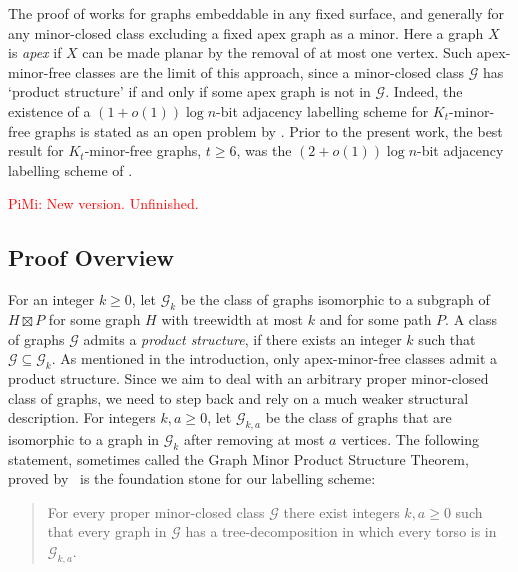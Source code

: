 \documentclass{patmorin}
\renewcommand{\geq}{\geqslant}
\newcommand{\piotr}[1]{\noindent\textcolor{red}{PiMi: #1}}
\newcommand{\defin}[1]{\emph{\textcolor{brightmaroon}{#1}}}
\newcommand{\calG}{\mathcal{G}}
\begin{document}
The proof of \citet{dujmovic.esperet.ea:adjacency} works for  graphs embeddable in any fixed surface, and generally for any minor-closed class excluding a fixed apex graph as a minor. Here a graph $X$ is \defin{apex} if $X$ can be made planar by the removal of at most one vertex.
Such apex-minor-free classes are the limit of this approach, since a minor-closed class $\calG$ has `product structure' if and only if some apex graph is not in $\calG$. Indeed, the existence of a $(1+o(1))\log n$-bit adjacency labelling scheme for $K_t$-minor-free graphs is stated as an open problem by \citet[Section~6, Problem~2]{dujmovic.esperet.ea:adjacency}. Prior to the present work, the best result for $K_t$-minor-free graphs, $t\geq 6$, was the $(2+o(1))\log n$-bit adjacency labelling scheme of \citet{gavoille.labourel:shorter}.


\piotr{New version. Unfinished.}

\subsection{Proof Overview}

For an integer $k\geq 0$, let \defin{$\calG_{k}$} be the class of graphs isomorphic to a subgraph of $H\boxtimes P$ for some graph $H$ with treewidth at most $k$ and for some path $P$.  
A class of graphs $\calG$ admits a \defin{product structure}, 
if there exists an integer $k$ such that $\calG\subseteq \calG_k$. 
As mentioned in the introduction, 
only apex-minor-free classes admit a  product structure. 
Since we aim to deal with an arbitrary proper minor-closed class of graphs, we need to step back and rely on a much weaker structural description. 
For integers $k,a\geq 0$, let \defin{$\calG_{k,a}$} be the class of graphs that are isomorphic to a graph in $\calG_k$ after removing at most $a$ vertices.
The following statement, sometimes called the Graph Minor Product Structure Theorem,  proved by~\citet{dujmovic.joret.ea:planar} is the foundation stone for our labelling scheme:
\begin{quote}
  For every proper minor-closed class $\calG$ there exist integers $k,a\geq 0$ such that every graph in $\calG$ has a tree-decomposition in which every torso is in $\calG_{k,a}$.    
\end{quote}
\end{document}
